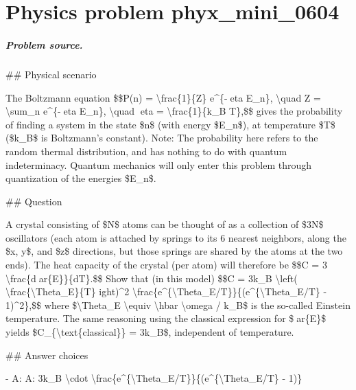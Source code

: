 
\chapter{Physics problem phyx\_mini\_0604}
\label{ch:PhyXMiniProblems_problem_phyx_mini_0604}

\paragraph{Problem source.}
\#\# Physical scenario

The Boltzmann equation \$\$P(n) = \textbackslash{}frac\{1\}\{Z\} e\textasciicircum{}\{-eta E\_n\}, \textbackslash{}quad Z = \textbackslash{}sum\_n e\textasciicircum{}\{-eta E\_n\}, \textbackslash{}quad eta = \textbackslash{}frac\{1\}\{k\_B T\},\$\$ gives the probability of finding a system in the state \$n\$ (with energy \$E\_n\$), at temperature \$T\$ (\$k\_B\$ is Boltzmann's constant). Note: The probability here refers to the random thermal distribution, and has nothing to do with quantum indeterminacy. Quantum mechanics will only enter this problem through quantization of the energies \$E\_n\$.

\#\# Question

A crystal consisting of \$N\$ atoms can be thought of as a collection of \$3N\$ oscillators (each atom is attached by springs to its 6 nearest neighbors, along the \$x, y\$, and \$z\$ directions, but those springs are shared by the atoms at the two ends). The heat capacity of the crystal (per atom) will therefore be \$\$C = 3 \textbackslash{}frac\{dar\{E\}\}\{dT\}.\$\$ Show that (in this model) \$\$C = 3k\_B \textbackslash{}left( \textbackslash{}frac\{\textbackslash{}Theta\_E\}\{T\} 
ight)\textasciicircum{}2 \textbackslash{}frac\{e\textasciicircum{}\{\textbackslash{}Theta\_E/T\}\}\{(e\textasciicircum{}\{\textbackslash{}Theta\_E/T\} - 1)\textasciicircum{}2\},\$\$ where \$\textbackslash{}Theta\_E \textbackslash{}equiv \textbackslash{}hbar \textbackslash{}omega / k\_B\$ is the so-called Einstein temperature. The same reasoning using the classical expression for \$ar\{E\}\$ yields \$C\_\{\textbackslash{}text\{classical\}\} = 3k\_B\$, independent of temperature.

\#\# Answer choices

- A: A: 3k\_B \textbackslash{}cdot \textbackslash{}frac\{e\textasciicircum{}\{\textbackslash{}Theta\_E/T\}\}\{(e\textasciicircum{}\{\textbackslash{}Theta\_E/T\} - 1)\}

